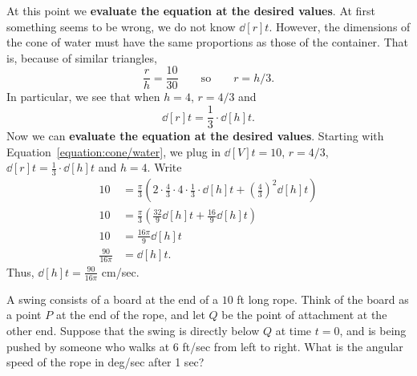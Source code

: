 \begin{solution}
At this point we \textbf{evaluate the equation at the desired values}.
At first something seems to be wrong, we do not know $\dd[r]{t}$.
However, the dimensions of the cone of water must have the same
proportions as those of the container.  That is, because of similar
triangles, 
\[
\frac{r}{h}=\frac{10}{30} \qquad\text{so}\qquad r={h/3}.
\]  
In particular, we see that when $h = 4$, $r=4/3$ and 
\[
\dd[r]{t} = \frac{1}{3}\cdot \dd[h]{t}.
\]
Now we can \textbf{evaluate the equation at the desired
  values}. Starting with Equation~\ref{equation:cone/water}, we plug
in $\dd[V]{t} = 10$, $r = 4/3$, $\dd[r]{t} = \frac{1}{3}\cdot \dd[h]{t}$
and $h=4$. Write
\begin{align*}
10 &= \frac{\pi}{3}\left(2\cdot \frac{4}{3}\cdot 4 \cdot\frac{1}{3}\cdot\dd[h]{t} + \left(\frac{4}{3}\right)^2 \dd[h]{t}\right)\\
10 &= \frac{\pi}{3}\left(\frac{32}{9}\dd[h]{t} + \frac{16}{9} \dd[h]{t}\right)\\
10 &= \frac{16\pi}{9}\dd[h]{t}\\
\frac{90}{16\pi} &= \dd[h]{t}.
\end{align*}
Thus, $\dd[h]{t}=\frac{90}{16\pi}$ cm/sec.
\end{solution}

\begin{example}
A swing consists of a board at the end of a $10$ ft long rope.  Think
of the board as a point $P$ at the end of the rope, and let $Q$ be the
point of attachment at the other end.  Suppose that the swing is
directly below $Q$ at time $t=0$, and is being pushed by someone who
walks at 6 ft/sec from left to right.  What is the angular speed of
the rope in deg/sec after 1 sec?
\end{example}

